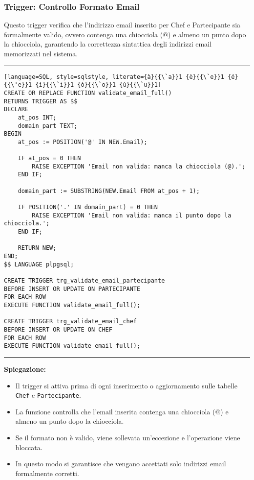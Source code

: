 \subsubsection{Trigger: Controllo Formato Email}

Questo trigger verifica che l'indirizzo email inserito per Chef e Partecipante sia formalmente valido, ovvero contenga una chiocciola (@) e almeno un punto dopo la chiocciola, garantendo la correttezza sintattica degli indirizzi email memorizzati nel sistema.

\noindent\rule{\textwidth}{0.4pt}
\begin{lstlisting}[language=SQL, style=sqlstyle, literate={à}{{\`a}}1 {è}{{\`e}}1 {é}{{\'e}}1 {ì}{{\`i}}1 {ò}{{\`o}}1 {ù}{{\`u}}1]
CREATE OR REPLACE FUNCTION validate_email_full()
RETURNS TRIGGER AS $$
DECLARE
    at_pos INT;
    domain_part TEXT;
BEGIN
    at_pos := POSITION('@' IN NEW.Email);

    IF at_pos = 0 THEN
        RAISE EXCEPTION 'Email non valida: manca la chiocciola (@).';
    END IF;

    domain_part := SUBSTRING(NEW.Email FROM at_pos + 1);

    IF POSITION('.' IN domain_part) = 0 THEN
        RAISE EXCEPTION 'Email non valida: manca il punto dopo la chiocciola.';
    END IF;

    RETURN NEW;
END;
$$ LANGUAGE plpgsql;

CREATE TRIGGER trg_validate_email_partecipante
BEFORE INSERT OR UPDATE ON PARTECIPANTE
FOR EACH ROW
EXECUTE FUNCTION validate_email_full();

CREATE TRIGGER trg_validate_email_chef
BEFORE INSERT OR UPDATE ON CHEF
FOR EACH ROW
EXECUTE FUNCTION validate_email_full();
\end{lstlisting}
\noindent\rule{\textwidth}{0.4pt}

\textbf{Spiegazione:}
\begin{itemize}
    \item Il trigger si attiva prima di ogni inserimento o aggiornamento sulle tabelle \texttt{Chef} e \texttt{Partecipante}.
    \item La funzione controlla che l'email inserita contenga una chiocciola (@) e almeno un punto dopo la chiocciola.
    \item Se il formato non è valido, viene sollevata un'eccezione e l'operazione viene bloccata.
    \item In questo modo si garantisce che vengano accettati solo indirizzi email formalmente corretti.
\end{itemize}

